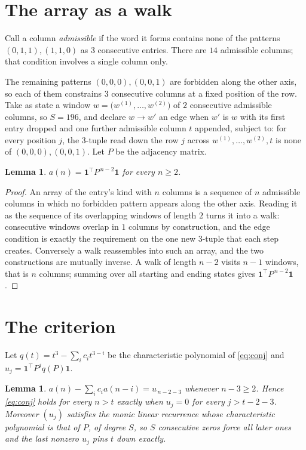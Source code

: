 \documentclass[11pt,a4paper]{article}
\theoremstyle{plain}
\newtheorem{lemma}[theorem]{Lemma}
\theoremstyle{definition}
\begin{document}
\section{The array as a walk}

Call a column \emph{admissible} if the word it forms contains none of the patterns
$(0,1,1), (1,1,0)$ as $3$ consecutive entries. There are $14$ admissible columns; that condition
involves a single column only.

The remaining patterns $(0,0,0), (0,0,1)$ are forbidden along the other axis, so each of them
constrains $3$ consecutive columns at a fixed position of the row. Take as state a
window $w=\bigl(w^{(1)},\dots,w^{(2)}\bigr)$ of $2$ consecutive admissible
columns, so $S=196$, and declare $w\to w'$ an edge when $w'$ is $w$ with its first entry
dropped and one further admissible column $t$ appended, subject to: for every position
$j$, the $3$-tuple read down the row $j$ across $w^{(1)},\dots,w^{(2)},t$
is none of $(0,0,0), (0,0,1)$. Let $P$ be the adjacency matrix.

\begin{lemma}\label{lem:walk}
$a(n)=\mathbf{1}^{\!\top}P^{\,n-2}\mathbf{1}$ for every $n\ge2$.
\end{lemma}

\begin{proof}
An array of the entry's kind with $n$ columns is a sequence of $n$ admissible columns in
which no forbidden pattern appears along the other axis. Reading it as the sequence of its
overlapping windows of length $2$ turns it into a walk: consecutive windows overlap in
$1$ columns by construction, and the edge condition is exactly the requirement on the one
new $3$-tuple that each step creates. Conversely a walk reassembles into such an array,
and the two constructions are mutually inverse. A walk of length $n-2$ visits $n-1$
windows, that is $n$ columns; summing over all starting and ending states gives
$\mathbf{1}^{\!\top}P^{\,n-2}\mathbf{1}$.
\end{proof}

\section{The criterion}

Let $q(t)=t^{3}-\sum_i c_i t^{3-i}$ be the characteristic polynomial of
\eqref{eq:conj} and $u_j=\mathbf{1}^{\!\top}P^{j}q(P)\mathbf{1}$.

\begin{lemma}\label{lem:crit}
$a(n)-\sum_i c_i a(n-i)=u_{\,n-2-3}$ whenever $n-3\ge2$. Hence
\eqref{eq:conj} holds for every $n>t$ exactly when $u_j=0$ for every
$j>t-2-3$. Moreover $(u_j)$ satisfies the monic linear recurrence whose
characteristic polynomial is that of $P$, of degree $S$, so $S$ consecutive zeros force all
later ones and the last nonzero $u_j$ pins $t$ down exactly.
\end{lemma}
\end{document}
